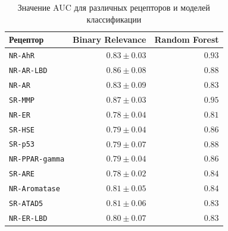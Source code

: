 \documentclass{ITaSconf}
\newcommand\headline{\hline}
\begin{document}
\begin{table}[H]%
	\caption{Значение AUC для различных рецепторов и моделей классификации}
	\label{t:methodCmp}
	\centering\medskip%
	\begin{tabular}{lrr}
		\headline
		
		Рецептор
		
		& Binary Relevance
		& Random Forest \cite{qsar} \\
		
		\headline
		
		{\tt NR-AhR}
		& $\mathbf{0.83} \pm 0.03$
		& $\mathbf{0.93}$ \\
		
		{\tt NR-AR-LBD}
		& $\mathbf{0.86} \pm 0.08$
		& $\mathbf{0.88}$ \\
		
		{\tt NR-AR}
		& $\mathbf{0.83} \pm 0.09$
		& $\mathbf{0.83}$ \\
		
		{\tt SR-MMP}
		& $\mathbf{0.87} \pm 0.03$
		& $\mathbf{0.95}$ \\
		
		{\tt NR-ER}
		& $\mathbf{0.78} \pm 0.04$
		& $\mathbf{0.81}$ \\
		
		{\tt SR-HSE}
		& $\mathbf{0.79} \pm 0.04$
		& $\mathbf{0.86}$ \\
		
		{\tt SR-p53}
		& $\mathbf{0.79} \pm 0.07$
		& $\mathbf{0.88}$ \\
		
		{\tt NR-PPAR-gamma}
		& $\mathbf{0.79} \pm 0.04$
		& $\mathbf{0.86}$ \\
		
		{\tt SR-ARE}
		& $\mathbf{0.78} \pm 0.02$
		& $\mathbf{0.84}$ \\
		
		{\tt NR-Aromatase}
		& $\mathbf{0.81} \pm 0.05$
		& $\mathbf{0.84}$ \\
		
		{\tt SR-ATAD5}
		& $\mathbf{0.81} \pm 0.06$
		& $\mathbf{0.83}$ \\
		
		{\tt NR-ER-LBD}
		& $\mathbf{0.80} \pm 0.07$
		& $\mathbf{0.83}$ \\
		\hline
	\end{tabular}
\end{table}
\end{document}

